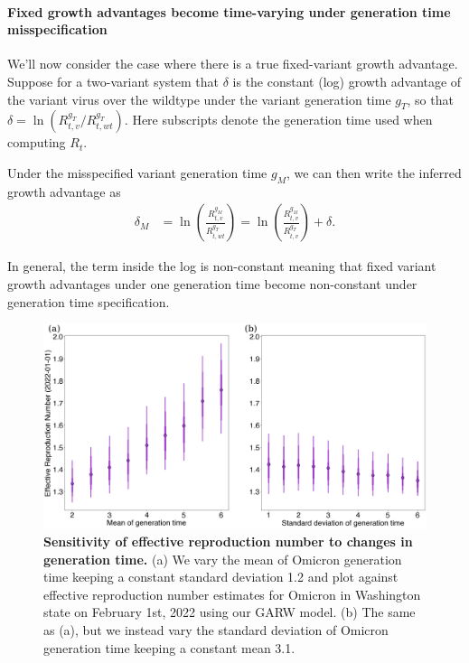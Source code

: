 \paragraph{Fixed growth advantages become time-varying under generation time misspecification}

We'll now consider the case where there is a true fixed-variant growth advantage. Suppose for a two-variant system that $\delta$ is the constant (log) growth advantage of the variant virus over the wildtype under the variant generation time $g_{T}$, so that $\delta = \ln \left( R_{t,v}^{g_{T}} / R_{t, wt}^{g_{T}} \right)$.
Here subscripts denote the generation time used when computing $R_{t}$.

Under the misspecified variant generation time $g_{M}$, we can then write the inferred growth advantage as
\begin{align*}
  \delta_{M} &= \ln \left( \frac{R_{t,v}^{g_{M}}}{R_{t, wt}^{g_{T}}} \right) = \ln \left(\frac{R_{t,v}^{g_{M}}}{R_{t,v}^{g_{T}}}\right) + \delta.
\end{align*}

In general, the term inside the log is non-constant meaning that fixed variant growth advantages under one generation time become non-constant under generation time specification.

\begin{figure}
  \centering
  \includegraphics[width=\linewidth]{figs/generation_time_sensitivity.png}
  \caption[\textbf{Sensitivity of effective reproduction number to changes in generation time.}]{
    \textbf{Sensitivity of effective reproduction number to changes in generation time.}
(a) We vary the mean of Omicron generation time keeping a constant standard deviation 1.2 and plot against effective reproduction number estimates for Omicron in Washington state on February 1st, 2022 using our GARW model.
(b) The same as (a), but we instead vary the standard deviation of Omicron generation time keeping a constant mean 3.1.}%
  \label{fig:generation_time_sensitivity}
\end{figure}

